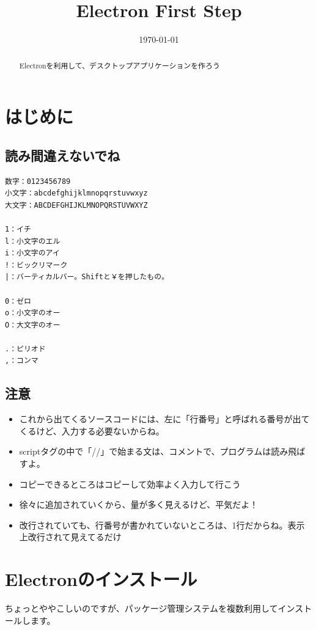 \documentclass[mingoth,11pt,a4j,uplatex]{jsarticle}
\title{Electron First Step}
\date{\today}
\begin{document}

\maketitle

\begin{abstract}
Electronを利用して、デスクトップアプリケーションを作ろう
\end{abstract}

\tableofcontents
\newpage

\section{はじめに}
\subsection{読み間違えないでね}

\begin{lstlisting}[caption=読み間違えないでね]
数字：0123456789
小文字：abcdefghijklmnopqrstuvwxyz
大文字：ABCDEFGHIJKLMNOPQRSTUVWXYZ

1：イチ
l：小文字のエル
i：小文字のアイ
!：ビックリマーク
|：バーティカルバー。Shiftと￥を押したもの。

0：ゼロ
o：小文字のオー
O：大文字のオー

.：ピリオド
,：コンマ
\end{lstlisting}

\subsection{注意}
\begin{itemize}
\item これから出てくるソースコードには、左に「行番号」と呼ばれる番号が出てくるけど、入力する必要ないからね。

\item scriptタグの中で「//」で始まる文は、コメントで、プログラムは読み飛ばすよ。

\item コピーできるところはコピーして効率よく入力して行こう
\item 徐々に追加されていくから、量が多く見えるけど、平気だよ！
\item 改行されていても、行番号が書かれていないところは、1行だからね。表示上改行されて見えてるだけ
\end{itemize}

\newpage
\section{Electronのインストール}
ちょっとややこしいのですが、パッケージ管理システムを複数利用してインストールします。
\end{document}
